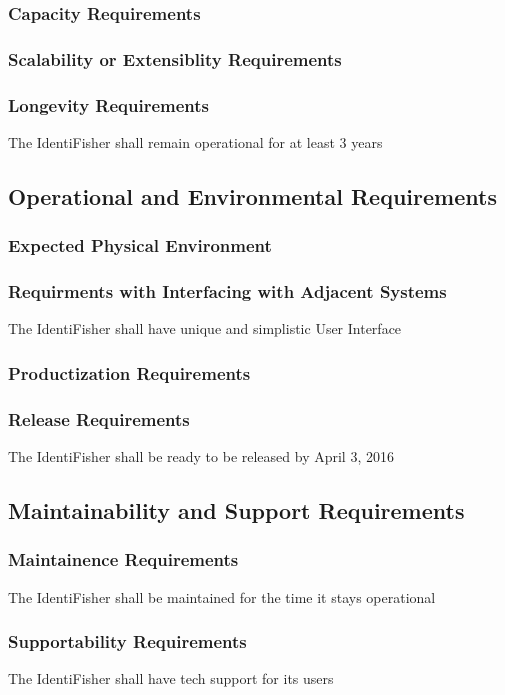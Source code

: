\documentclass{article}
\begin{document}
\subsubsection{Capacity Requirements}
\subsubsection{Scalability or Extensiblity Requirements}
\subsubsection{Longevity Requirements}
The IdentiFisher shall remain operational for at least 3 years

\subsection{Operational and Environmental Requirements}
\subsubsection{Expected Physical Environment}
\subsubsection{Requirments with Interfacing with Adjacent Systems}
The IdentiFisher shall have unique and simplistic User Interface
\subsubsection{Productization Requirements}
\subsubsection{Release Requirements}
The IdentiFisher shall be ready to be released by April 3, 2016

\subsection{Maintainability and Support Requirements}
\subsubsection{Maintainence Requirements}
The IdentiFisher shall be maintained for the time it stays operational
\subsubsection{Supportability Requirements}
The IdentiFisher shall have tech support for its users
\end{document}
